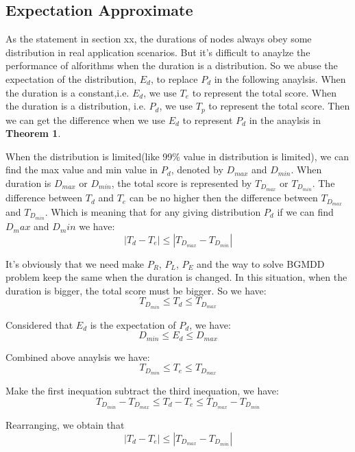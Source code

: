 \subsection{Expectation Approximate}
\par As the statement in section xx, the durations of nodes always obey some distribution in real application scenarios. But it's difficult to anaylze the performance of alforithms when the duration is a distribution. So we abuse the expectation of the distribution, $E_d$, to replace $P_d$ in the following anaylsis. When the duration is a constant,i.e. $E_d$, we use $T_e$ to represent the total score. When the duration is a distribution, i.e. $P_d$, we use $T_p$ to represent the total score. Then we can get the difference when we use $E_d$ to represent $P_d$ in the anaylsis in \textbf{Theorem 1}.
\begin{theorem}\label{theorem:TheFatTreeInApx}
When the distribution is limited(like 99\% value in distribution is limited), we can find the max value and min value in $P_d$, denoted by $D_{max}$ and $D_{min}$. When duration is $D_{max}$ or $D_{min}$, the total score is represented by $T_{D_{max}}$ or $T_{D_{min}}$. The difference between $T_d$ and $T_e$ can be no higher then the difference between $T_{D_{max}}$ and $T_{D_{min}}$. Which is meaning that for any giving distribution $P_d$ if we can find $D_max$ and $D_min$ we have:
$$\left| T_d-T_e \right|\leq\left| T_{D_{max}}-T_{D_{min}} \right|$$
\end{theorem}
\begin{IEEEproof}
It's obviously that we need make $P_R$, $P_L$, $P_E$ and the way to solve BGMDD problem keep the same when the duration is changed. In this situation, when the duration is bigger, the total score must be bigger. So we have:
$$ T_{D_{min}}\leq T_d \leq T_{D_{max}} $$
\par Considered that $E_d$ is the expectation of  $P_d$, we have:
$$D_{min}\leq E_d \leq D_{max}$$
\par Combined above anaylsis we have:
$$ T_{D_{min}}\leq T_e \leq T_{D_{max}} $$
\par Make the first inequation subtract the third inequation, we have:
$$ T_{D_{min}}-T_{D_{max}}\leq T_d-T_e \leq T_{D_{max}}-T_{D_{min}} $$
\par Rearranging, we obtain that
$$\left| T_d-T_e \right|\leq\left| T_{D_{max}}-T_{D_{min}} \right|$$

\end{IEEEproof}

